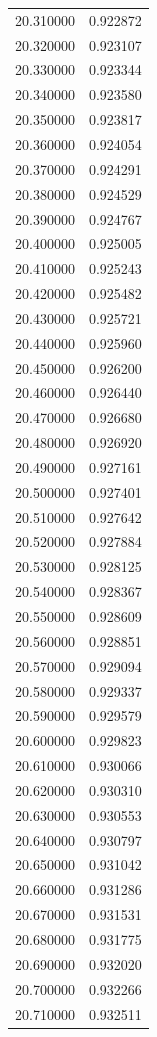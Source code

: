 \begin{tabular}{rr}
20.310000 & 0.922872 \\
20.320000 & 0.923107 \\
20.330000 & 0.923344 \\
20.340000 & 0.923580 \\
20.350000 & 0.923817 \\
20.360000 & 0.924054 \\
20.370000 & 0.924291 \\
20.380000 & 0.924529 \\
20.390000 & 0.924767 \\
20.400000 & 0.925005 \\
20.410000 & 0.925243 \\
20.420000 & 0.925482 \\
20.430000 & 0.925721 \\
20.440000 & 0.925960 \\
20.450000 & 0.926200 \\
20.460000 & 0.926440 \\
20.470000 & 0.926680 \\
20.480000 & 0.926920 \\
20.490000 & 0.927161 \\
20.500000 & 0.927401 \\
20.510000 & 0.927642 \\
20.520000 & 0.927884 \\
20.530000 & 0.928125 \\
20.540000 & 0.928367 \\
20.550000 & 0.928609 \\
20.560000 & 0.928851 \\
20.570000 & 0.929094 \\
20.580000 & 0.929337 \\
20.590000 & 0.929579 \\
20.600000 & 0.929823 \\
20.610000 & 0.930066 \\
20.620000 & 0.930310 \\
20.630000 & 0.930553 \\
20.640000 & 0.930797 \\
20.650000 & 0.931042 \\
20.660000 & 0.931286 \\
20.670000 & 0.931531 \\
20.680000 & 0.931775 \\
20.690000 & 0.932020 \\
20.700000 & 0.932266 \\
20.710000 & 0.932511 \\

\end{tabular}
